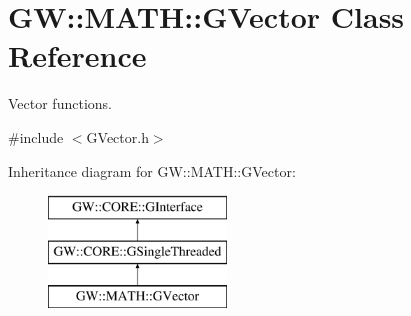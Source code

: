 \hypertarget{class_g_w_1_1_m_a_t_h_1_1_g_vector}{}\section{GW\+:\+:M\+A\+TH\+:\+:G\+Vector Class Reference}
\label{class_g_w_1_1_m_a_t_h_1_1_g_vector}


Vector functions.  




{\ttfamily \#include $<$G\+Vector.\+h$>$}

Inheritance diagram for GW\+:\+:M\+A\+TH\+:\+:G\+Vector\+:\begin{figure}[H]
\begin{center}
\leavevmode
\includegraphics[height=3.000000cm]{class_g_w_1_1_m_a_t_h_1_1_g_vector}
\end{center}
\end{figure}
